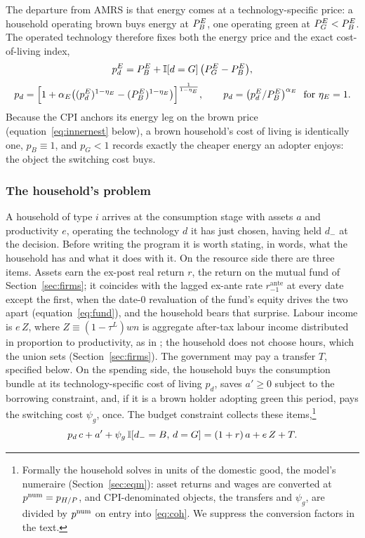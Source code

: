 The departure from AMRS is that energy comes at a technology-specific price: a
household operating brown buys energy at $P^{E}_{B}$, one operating green at $P^{E}_{G}<P^{E}_{B}$.
The operated technology therefore fixes both the energy price and the exact
cost-of-living index,
%
\begin{equation}
p^E_d=P^{E}_{B}+\mathbb{I}[d=G]\,\bigl(P^{E}_{G}-P^{E}_{B}\bigr),
\label{eq:pEd}
\end{equation}
\begin{equation}
p_d=\Bigl[1+\alpha_E\bigl((p^E_d)^{1-\eta_E}-(P^{E}_{B})^{1-\eta_E}\bigr)\Bigr]^{\frac{1}{1-\eta_E}},
\qquad
p_d=\bigl(p^E_d/P^{E}_{B}\bigr)^{\alpha_E}\ \text{ for }\eta_E=1.
\label{eq:pd}
\end{equation}
%
Because the CPI anchors its energy leg on the brown price
(equation~\eqref{eq:innernest} below), a brown household's cost of living is
identically one, $p_B\equiv1$, and $p_G<1$ records exactly the cheaper energy an
adopter enjoys: the object the switching cost buys.

\subsubsection{The household's problem}\label{sec:problem}

A household of type $i$ arrives at the consumption stage with assets $a$ and
productivity $e$, operating the technology $d$ it has just chosen, having held $d_-$
at the decision. Before writing the program it is worth stating, in words, what the
household has and what it does with it. On the resource side there are three items.
Assets earn the ex-post real return $r$, the return on the mutual fund of
Section~\ref{sec:firms}; it coincides with the lagged ex-ante rate
$r^{\mathrm{ante}}_{-1}$ at every date except the first, when the date-0 revaluation
of the fund's equity drives the two apart (equation~\eqref{eq:fund}), and the
household bears that surprise. Labour income is $e\,Z$, where $Z\equiv(1-\tau^L)wn$
is aggregate after-tax labour income distributed in proportion to productivity, as in
\citet{ARS2024}; the household does not choose hours, which the union sets
(Section~\ref{sec:firms}). The government may pay a transfer $T$, specified below. On
the spending side, the household buys the consumption bundle at its
technology-specific cost of living $p_d$, saves $a'\ge0$ subject to the borrowing
constraint, and, if it is a brown holder adopting green this period, pays the
switching cost $\psi_g$, once. The budget constraint collects these
items,\footnote{Formally the household solves in units of the domestic good,
the model's numeraire (Section~\ref{sec:eqm}): asset returns and wages are converted
at $p^{\mathrm{num}}=p_{H/P}$, and CPI-denominated objects, the transfers and $\psi_g$, are
divided by $p^{\mathrm{num}}$ on entry into \eqref{eq:coh}. We suppress the conversion factors
in the text.}
%
\begin{equation}
p_d\,c+a'+\psi_g\,\mathbb{I}[d_-=B,\,d=G]=(1+r)\,a+e\,Z+T.
\label{eq:coh}
\end{equation}

